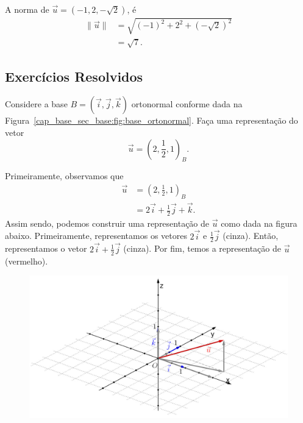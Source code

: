 \begin{ex}
  A norma de $\vec{u} = \left(-1,2,-\sqrt{2}\right)$, é
  \begin{align}
    \|\vec{u}\| &= \sqrt{(-1)^2 + 2^2 + \left(-\sqrt{2}\right)^2}\\
                &= \sqrt{7}.
  \end{align}
\end{ex}

\subsection{Exercícios Resolvidos}

\begin{exeresol}
  Considere a base $B=(\vec{i}, \vec{j}, \vec{k})$ ortonormal conforme dada na Figura~\ref{cap_base_sec_base:fig:base_ortonormal}. Faça uma representação do vetor 
  \begin{equation}
    \vec{u}=\left(2, \frac{1}{2}, 1\right)_B.
  \end{equation}
\end{exeresol}
\begin{resol}
  Primeiramente, observamos que
  \begin{align}
    \vec{u} &= \left(2, \frac{1}{2}, 1\right)_B\\
            &= 2\vec{i} + \frac{1}{2}\vec{j} + \vec{k}.
  \end{align}
  Assim sendo, podemos construir uma representação de $\vec{u}$ como dada na figura abaixo. Primeiramente, representamos os vetores $2\vec{i}$ e $\frac{1}{2}\vec{j}$ (cinza). Então, representamos o vetor $2\vec{i}+\frac{1}{2}\vec{j}$ (cinza). Por fim, temos a representação de $\vec{u}$ (vermelho).
  \begin{figure}[H]
    \centering
    \includegraphics[width=5in]{cap_base/dados/fig_exeresol_base/fig.jpg}
  \end{figure}
\end{resol}

